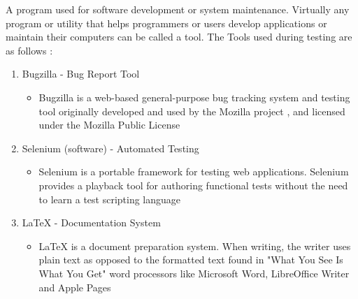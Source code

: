 A program used for software development or system maintenance. Virtually any program
or utility that helps programmers
or users develop applications or maintain their computers can be called a tool.
The Tools used during testing are as follows :

\begin{enumerate}
   \item Bugzilla - Bug Report Tool
   \begin{itemize}
     \item Bugzilla is a web-based general-purpose bug tracking system and testing tool originally developed and used by the Mozilla project
     , and licensed under the Mozilla Public License
   \end{itemize}
   \item Selenium (software) - Automated Testing
   \begin{itemize}
     \item Selenium is a portable framework for testing web applications. Selenium provides a playback tool for authoring
      functional tests without the need to learn a test scripting language
   \end{itemize}

   \item   LaTeX - Documentation System
   \begin{itemize}
     \item LaTeX is a document preparation system. When writing, the writer uses plain text as opposed to the formatted text found in "What You See Is What You Get"
      word processors like Microsoft Word, LibreOffice Writer and Apple Pages
   \end{itemize}
\end{enumerate}

